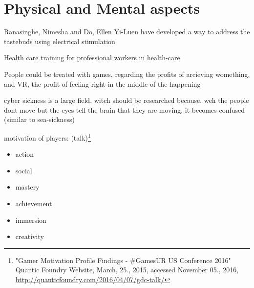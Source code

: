 \section{Physical and Mental aspects}

Ranasinghe, Nimesha and Do, Ellen Yi-Luen have developed a way to address the tastebuds using electrical stimulation \cite{Ranasinghe:2016:VSS:2984751.2985729}

Health care training for professional workers in health-care

People could be treated with games, regarding the profits of arcieving womething, and VR, the profit of feeling right in the middle of the happening

cyber sickness is a large field, witch should be researched because, weh the people dont move but the eyes tell the brain that they are moving, it becomes confused (similar to sea-sickness)

motivation of players: (talk)\footnote{"Gamer Motivation Profile Findings - \#GamesUR US Conference 2016" Quantic Foundry Website, March, 25., 2015, accessed November 05., 2016, \url{http://quanticfoundry.com/2016/04/07/gdc-talk/}}
\begin{itemize}
	\item action
	\item social
	\item mastery
	\item achievement
	\item immersion
	\item creativity
\end{itemize}

